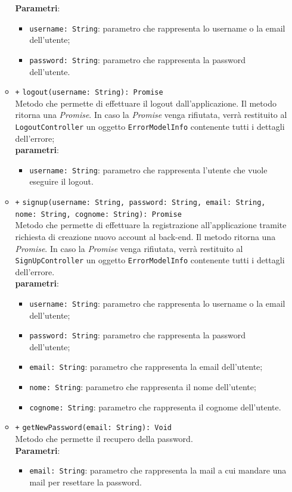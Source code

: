 \begin{itemize}
\begin{itemize}
			\textbf{Parametri}: 
			\begin{itemize}
				\item \texttt{username: String}: parametro che rappresenta lo username o la email dell'utente;
				\item \texttt{password: String}: parametro che rappresenta la password dell'utente.
			\end{itemize}
		\item \texttt{+} \texttt{logout(username: String): Promise} \\ Metodo che permette di effettuare il logout dall'applicazione. Il metodo ritorna una \textit{Promise}. In caso la \textit{Promise} venga rifiutata, verrà restituito al \texttt{LogoutController} un oggetto \texttt{ErrorModelInfo} contenente tutti i dettagli dell'errore; \\
		\textbf{parametri}:
		\begin{itemize}
			\item \texttt{username: String}: parametro che rappresenta l'utente che vuole eseguire il logout.
		\end{itemize}
		\item \texttt{+} \texttt{signup(username: String, password: String, email: String, nome: String, cognome: String): Promise} \\Metodo che permette di effettuare la registrazione all'applicazione tramite richiesta di creazione nuovo account al back-end. Il metodo ritorna una \textit{Promise}. In caso la \textit{Promise} venga rifiutata, verrà restituito al \texttt{SignUpController} un oggetto \texttt{ErrorModelInfo} contenente tutti i dettagli dell'errore. \\
			\textbf{parametri}:
			\begin{itemize}
				\item \texttt{username: String}: parametro che rappresenta lo username o la email dell'utente;
				\item \texttt{password: String}: parametro che rappresenta la password dell'utente;
				\item \texttt{email: String}: parametro che rappresenta la email dell'utente;
				\item \texttt{nome: String}: parametro che rappresenta il nome dell'utente;
				\item \texttt{cognome: String}: parametro che rappresenta il cognome dell'utente.
			\end{itemize}
		\item \texttt{+} \texttt{getNewPassword(email: String): Void}  \\Metodo che permette il recupero della password. \\
			\textbf{Parametri}:
			\begin{itemize}
				\item \texttt{email: String}: parametro che rappresenta la mail a cui mandare una mail per resettare la password.
			\end{itemize}
	\end{itemize}
\end{itemize}


